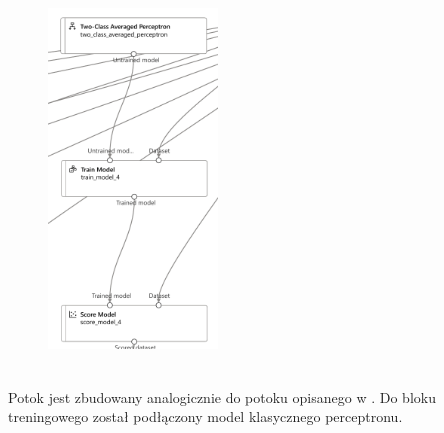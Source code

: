 \begin{figure}[H]
    \centering
    \includegraphics[width=0.4\textwidth]{images/ap_pipe}
    \label{fig:ap-pipe}
\end{figure}
\ \\
Potok jest zbudowany analogicznie do potoku opisanego w . Do bloku treningowego został podłączony model klasycznego perceptronu.

